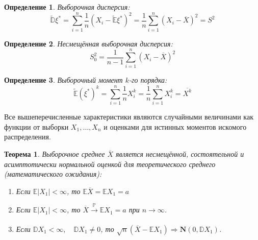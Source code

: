 \documentclass[oneside,final,14pt]{extreport}
\newtheorem{thm}{Теорема}[section]
\theoremstyle{definition}
\newtheorem{defn}{Определение}[section]
\begin{document}
\begin{defn}
{\it Выборочная дисперсия:}
\begin{equation*}
    \tilde{\mathbb{D}} \xi^{*}=\sum_{i=1}^{n} \frac{1}{n}(X_{i}-\tilde{\mathbb{E}} \xi^{*})^{2}=\frac{1}{n} \sum_{i=1}^{n}(X_{i}-\overline{X})^{2}=S^{2}
\end{equation*}
\end{defn}

\begin{defn}
{\it Несмещённая выборочная дисперсия:} 
\begin{equation*}
    S_{0}^{2}=\frac{1}{n-1} \sum_{i=1}^{n}\left(X_{i}-\overline{X}\right)^{2}
\end{equation*}
\end{defn}

\begin{defn}
{\it Выборочный момент $k$-го порядка:}
\begin{equation*}
    \tilde{\mathbb{E}}(\xi^{*})^{k}=\sum_{i=1}^{n} \frac{1}{n} X_{i}^{k}=\frac{1}{n} \sum_{i=1}^{n} X_{i}^{k}=\overline{X^{k}}
\end{equation*}
\end{defn}

Все вышеперечисленные характеристики являются случайными величинами как функции от выборки $X_{1}, \ldots, X_{n}$ и оценками для истинных моментов искомого распределения.

\begin{thm}
Выборочное среднее $\overline{X}$ является несмещённой, состоятельной и асимптотически нормальной оценкой для теоретического среднего (математического ожидания):

\begin{enumerate}[label={\arabic*.}]
    \item Если $\mathbb{E}|X_{1}|<\infty$, то $\mathbb{E}\overline{X}=\mathbb{E} X_{1}=a$
    \item Если $\mathbb{E}|X_{1}|<\infty$, то $\overline{X} \xrightarrow[]{\mathbb{P}} \mathbb{E} X_{1}=a$ при $n \rightarrow \infty$.
    \item Если $\mathbb{D} X_{1}<\infty, \quad \mathbb{D} X_{1} \neq 0$, то $\sqrt{n}(\overline{X}-\mathbb{E} X_{1}) \Rightarrow \mathbf{N}(0, \mathbb{D} X_{1})$.
\end{enumerate}
\end{thm}
\end{document}

